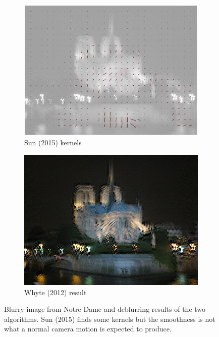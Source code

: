 \documentclass[10pt,twocolumn,letterpaper]{article}
\begin{document}
\begin{figure}
\begin{center}
\begin{subfigure}{0.45\textwidth}
\includegraphics[width=0.9\linewidth]{notredame_kernels}
\caption{Sun \etal (2015) kernels}
\label{fig:subim7}
\end{subfigure}
\begin{subfigure}{0.45\textwidth}
\graphicspath{ {deblurwhyte/} }
\includegraphics[width=0.9\linewidth]{notredame_whyte}
\caption{Whyte \etal (2012) result}
\label{fig:subim6}
\end{subfigure}
 
\caption{Blurry image from Notre Dame and deblurring results of the two algorithms. Sun \etal (2015) finds some kernels but the smoothness is not what a normal camera motion is expected to produce.}
\label{fig:image3}
\end{center}
\end{figure}


\end{document}
